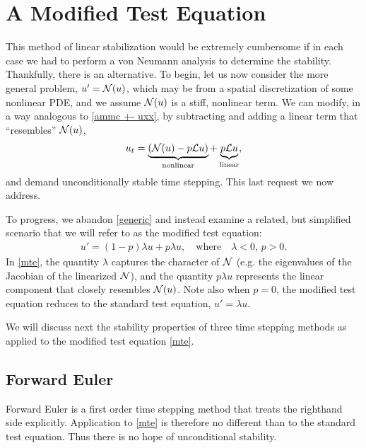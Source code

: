 \section{A Modified Test Equation}
This method of linear stabilization would be extremely cumbersome if in each case we had to perform a von Neumann analysis to determine the stability. Thankfully, there is an alternative.
To begin, let us now consider the more general problem, $u' = \mathcal{N}(u)$, which may be from a spatial discretization of some nonlinear PDE, and we assume $\mathcal{N}(u)$ is a stiff, nonlinear term. We can modify, in a way analogous to \eqref{ammc +- uxx}, by subtracting and adding a linear term that ``resembles'' $\mathcal{N}(u)$,
\begin{align}
u_t = \underbrace{ (\mathcal{N}(u) - p\mathcal{L} u)}_\text{nonlinear} + \underbrace{p\mathcal{L} u}_\text{linear},
\label{generic} 
\end{align}
and demand unconditionally stable time stepping. This last request we now address.

To progress, we abandon \eqref{generic} and instead examine a related, but simplified scenario that we will refer to as the modified test equation: 
\begin{align}
u' = (1-p)\lambda u + p\lambda u,
\quad\text{where}\quad \lambda < 0\text{, } p>0.
\label{mte}
\end{align}
In \eqref{mte}, the quantity $\lambda$ captures the character of $\mathcal{N}$ (e.g. the eigenvalues of the Jacobian of the linearized $\mathcal{N}$), and the quantity $p\lambda u$ represents the linear component that closely resembles $\mathcal{N}(u)$. Note also when $p=0$, the modified test equation reduces to the standard test equation, $u'=\lambda u$.

We will discuss next the stability properties of three time stepping methods as applied to the modified test equation \eqref{mte}.

\subsection{Forward Euler}
Forward Euler is a first order time stepping method that treats the righthand side explicitly. Application to \eqref{mte} is therefore no different than to the standard test equation. Thus there is no hope of unconditional stability.


